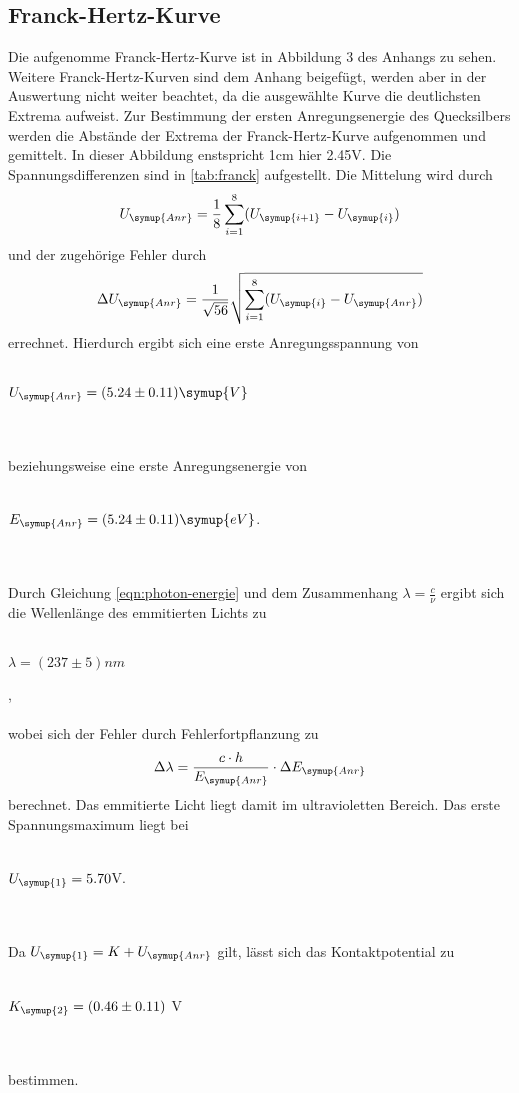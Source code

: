     \subsection{Franck-Hertz-Kurve} 
    \label{sec:franck}
    Die aufgenomme Franck-Hertz-Kurve ist in Abbildung 3 des Anhangs zu sehen. 
    Weitere Franck-Hertz-Kurven sind dem Anhang beigefügt, werden aber in der Auswertung nicht weiter beachtet,
    da die ausgewählte Kurve die deutlichsten Extrema aufweist. Zur Bestimmung der ersten Anregungsenergie des Quecksilbers
    werden die Abstände der Extrema der Franck-Hertz-Kurve aufgenommen und gemittelt. In dieser Abbildung enstspricht 1cm hier 2.45V. Die Spannungsdifferenzen
    sind in \autoref{tab:franck} aufgestellt. Die Mittelung wird durch
    \begin{equation}
      U_{\symup{Anr}} = \frac{1}{8} \sum_{i = 1}^{8} (U_{\symup{i+1}} - U_{\symup{i}})
    \end{equation}  
    und der zugehörige Fehler durch 
    \begin{equation}
      \Delta U_{\symup{Anr}} = \frac{1}{\sqrt{56}} \sqrt{ \sum_{i = 1}^{8} (U_{\symup{i}} - U_{\symup{Anr}}) }
    \end{equation}
    errechnet. Hierdurch ergibt sich eine erste Anregungsspannung von 
    \\ \\
    \centerline{$U_{\symup{Anr}} = (5.24 \pm 0.11) \symup{V}$}
    \\ \\
    beziehungsweise eine erste Anregungsenergie von
    \\ \\
    \centerline{$E_{\symup{Anr}} = (5.24 \pm 0.11) \symup{eV}$.}
    \\ \\  
    Durch Gleichung \eqref{eqn:photon-energie} und dem Zusammenhang $\lambda = \frac{c}{\nu}$ ergibt sich die Wellenlänge des emmitierten Lichts zu
    \\ \\
    \centerline{$\lambda = (237 \pm 5) nm$},
    \\ \\
    wobei sich der Fehler durch Fehlerfortpflanzung zu
    \begin{equation}
      \Delta \lambda = \frac{c \cdot h}{E_{\symup{Anr}}} \cdot \Delta E_{\symup{Anr}}
    \end{equation}
    berechnet. Das emmitierte Licht liegt damit im ultravioletten Bereich. 
    Das erste Spannungsmaximum liegt bei 
    \\ \\
    \centerline{$U_{\symup{1}} = 5.70$V.}
    \\ \\
    Da $U_{\symup{1}} = K + U_{\symup{Anr}} $ gilt, lässt sich das Kontaktpotential zu 
    \\ \\
    \centerline{$K_{\symup{2}} = (0.46 \pm 0.11)$ V}
    \\ \\
    bestimmen.
    


